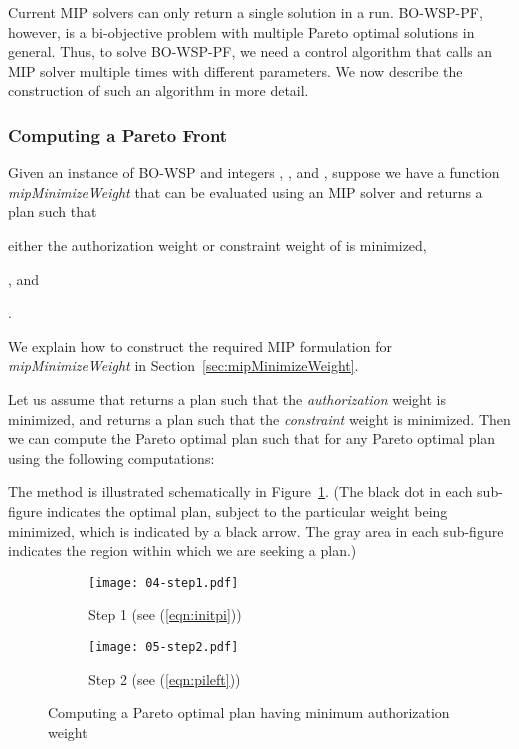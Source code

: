 \documentclass[jcs,crcready]{iosart1c}
\newcommand{\BOWSP}{\textsc{BO-WSP}\xspace}
\newcommand{\BOWSPPF}{\textsc{BO-WSP-PF}\xspace}
\begin{document}
 Current MIP solvers can only return a single solution in a run.
 \BOWSPPF, however, is a bi-objective problem with multiple Pareto optimal solutions in general.
 Thus, to solve \BOWSPPF, we need a control algorithm that calls an MIP solver multiple times with different parameters. We now describe the construction of such an algorithm in more detail.

\subsubsection{Computing a Pareto Front}

 Given an instance of \BOWSP and integers , ,  and , suppose we have a function {\it mipMinimizeWeight} that can be evaluated using an MIP solver and returns a plan  such that
  \begin{inparaenum}[(i)]
   \item either the authorization weight or constraint weight of  is minimized, 
   \item , and
   \item .
  \end{inparaenum}
 We explain how to construct the required MIP formulation for {\it mipMinimizeWeight} in Section~\ref{sec:mipMinimizeWeight}.
 
 Let us assume that  returns a plan  such that the \emph{authorization} weight is minimized, and   returns a plan such that the \emph{constraint} weight is minimized.
 Then we can compute the Pareto optimal plan  such that  for any Pareto optimal plan  using the following computations:
 
 The method is illustrated schematically in Figure~\ref{fig:computing-pareto-optimal-plan-minimizing-authorization}.
 (The black dot in each sub-figure indicates the optimal plan, subject to the particular weight being minimized, which is indicated by a black arrow.
 The gray area in each sub-figure indicates the region within which we are seeking a plan.)
 
\begin{figure}[!htb]\centering
\begin{subfigure}[t]{.45\textwidth}
	\centering
	\texttt{[image: 04-step1.pdf]}

\caption{Step 1 (see (\ref{eqn:initpi}))}
\end{subfigure}
\hfill
\begin{subfigure}[t]{.45\textwidth}
	\centering
	\texttt{[image: 05-step2.pdf]}

\caption{Step 2 (see (\ref{eqn:pileft}))}
\end{subfigure}
\caption{Computing a Pareto optimal plan having minimum authorization weight}
\label{fig:computing-pareto-optimal-plan-minimizing-authorization}
\end{figure}
\end{document}
